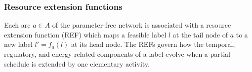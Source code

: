 \documentclass[3p,11pt,authoryear]{elsarticle}  %
\begin{document}

\subsubsection{Resource extension functions}

Each arc \(a\in A\) of the parameter-free network is associated with a resource extension function (REF) which maps a feasible label \(l\) at the tail node of \(a\) to a new label \(l'=f_a(l)\) at its head node. The REFs govern how the temporal, regulatory, and energy-related components of a label evolve when a partial schedule is extended by one elementary activity.
\end{document}
